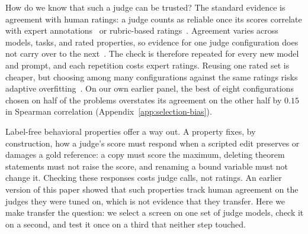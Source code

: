 How do we know that such a judge can be trusted?
The standard evidence is agreement with human ratings: a judge counts as reliable once its scores correlate with expert annotations~\citep{chen2026reform} or rubric-based ratings~\citep{Liu2023GEval,Zheng2023MTBench}.
Agreement varies across models, tasks, and rated properties, so evidence for one judge configuration does not carry over to the next~\citep{Kocmi2024HumanVsLLM}.
The check is therefore repeated for every new model and prompt, and each repetition costs expert ratings.
Reusing one rated set is cheaper, but choosing among many configurations against the same ratings risks adaptive overfitting~\citep{dwork2015reusableholdout}.
On our own earlier panel, the best of eight configurations chosen on half of the problems overstates its agreement on the other half by $0.15$ in Spearman correlation (Appendix~\ref{app:selection-bias}).

Label-free behavioral properties offer a way out.
A property fixes, by construction, how a judge's score must respond when a scripted edit preserves or damages a gold reference: a copy must score the maximum, deleting theorem statements must not raise the score, and renaming a bound variable must not change it.
Checking these responses costs judge calls, not ratings.
An earlier version of this paper showed that such properties track human agreement on the judges they were tuned on, which is not evidence that they transfer.
Here we make transfer the question: we select a screen on one set of judge models, check it on a second, and test it once on a third that neither step touched.

